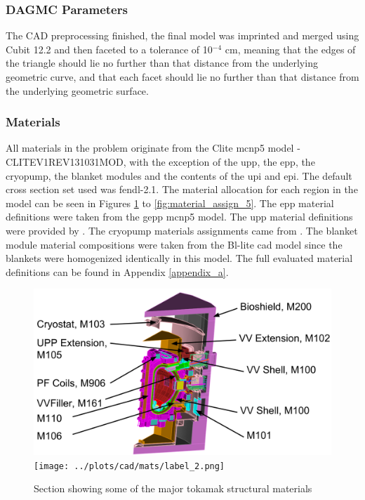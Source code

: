 \documentclass[12pt]{article}
\begin{document}
\subsubsection{DAGMC Parameters}
The CAD preprocessing finished, the final model was imprinted and merged using
Cubit 12.2 and then faceted to a tolerance of 10$^{-4}$ cm, meaning that the
edges of the triangle should lie no further than that distance from the underlying geometric
curve, and that each facet should lie no further than that distance from the underlying
geometric surface.
\newpage
\clearpage
\subsubsection{Materials}
All materials in the problem originate from the Clite \gls{mcnp5} model -
CLITE\textunderscore V1\textunderscore REV131031\textunderscore MOD, with the
exception of the \gls{upp}, the \gls{epp}, the
cryopump, the blanket modules and the contents of the \gls{upi} and \gls{epi}.
The default cross section set used was \gls{fendl}-2.1. The material allocation
for each region in the model can be seen in Figures \ref{fig:material_assign_1} 
to \ref{fig:material_assign_5}. The \gls{epp} material 
definitions were taken from the \gls{gepp} \gls{mcnp5} model\cite{epp_materials}.
The \gls{upp} material definitions were provided by 
\cite{bertalot_communication}. The cryopump materials assignments
came from \cite{cryopump_communication}. The blanket module material
compositions were taken from the Bl-lite \gls{cad} model since the blankets were
homogenized identically in this model. The full evaluated material definitions
can be found in Appendix \ref{appendix_a}.
\begin{figure}[p]
  \centering
  \includegraphics[scale=0.32]{../plots/cad/mats/label_1.png}
  \texttt{[image: ../plots/cad/mats/label\_2.png]}
  \caption{Section showing some of the major tokamak structural materials}
  \label{fig:material_assign_1}
\end{figure}
\end{document}
